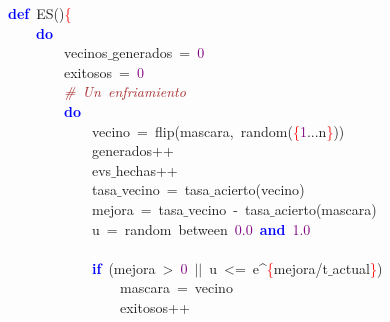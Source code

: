 \noindent
\mbox{}\textbf{\textcolor{Blue}{def}}\ ES\textcolor{BrickRed}{()}\textcolor{Red}{\{} \\
\mbox{}\ \ \ \ \textbf{\textcolor{Blue}{do}} \\
\mbox{}\ \ \ \ \ \ \ \ vecinos$\_$generados\ \textcolor{BrickRed}{=}\ \textcolor{Purple}{0} \\
\mbox{}\ \ \ \ \ \ \ \ exitosos\ \textcolor{BrickRed}{=}\ \textcolor{Purple}{0} \\
\mbox{}\ \ \ \ \ \ \ \ \textit{\textcolor{Brown}{\#\ Un\ enfriamiento}} \\
\mbox{}\ \ \ \ \ \ \ \ \textbf{\textcolor{Blue}{do}} \\
\mbox{}\ \ \ \ \ \ \ \ \ \ \ \ vecino\ \textcolor{BrickRed}{=}\ flip\textcolor{BrickRed}{(}mascara\textcolor{BrickRed}{,}\ random\textcolor{BrickRed}{(}\textcolor{Red}{\{}\textcolor{Purple}{1}\textcolor{BrickRed}{...}n\textcolor{Red}{\}}\textcolor{BrickRed}{))} \\
\mbox{}\ \ \ \ \ \ \ \ \ \ \ \ generados\textcolor{BrickRed}{++} \\
\mbox{}\ \ \ \ \ \ \ \ \ \ \ \ evs$\_$hechas\textcolor{BrickRed}{++} \\
\mbox{}\ \ \ \ \ \ \ \ \ \ \ \ tasa$\_$vecino\ \textcolor{BrickRed}{=}\ tasa$\_$acierto\textcolor{BrickRed}{(}vecino\textcolor{BrickRed}{)} \\
\mbox{}\ \ \ \ \ \ \ \ \ \ \ \ mejora\ \textcolor{BrickRed}{=}\ tasa$\_$vecino\ \textcolor{BrickRed}{-}\ tasa$\_$acierto\textcolor{BrickRed}{(}mascara\textcolor{BrickRed}{)} \\
\mbox{}\ \ \ \ \ \ \ \ \ \ \ \ u\ \textcolor{BrickRed}{=}\ random\ between\ \textcolor{Purple}{0.0}\ \textbf{\textcolor{Blue}{and}}\ \textcolor{Purple}{1.0} \\
\mbox{} \\
\mbox{}\ \ \ \ \ \ \ \ \ \ \ \ \textbf{\textcolor{Blue}{if}}\ \textcolor{BrickRed}{(}mejora\ \textcolor{BrickRed}{\textgreater{}}\ \textcolor{Purple}{0}\ \textcolor{BrickRed}{$|$$|$}\ u\ \textcolor{BrickRed}{\textless{}=}\ e\textcolor{BrickRed}{\textasciicircum{}}\textcolor{Red}{\{}mejora\textcolor{BrickRed}{/}t$\_$actual\textcolor{Red}{\}}\textcolor{BrickRed}{)} \\
\mbox{}\ \ \ \ \ \ \ \ \ \ \ \ \ \ \ \ mascara\ \textcolor{BrickRed}{=}\ vecino \\
\mbox{}\ \ \ \ \ \ \ \ \ \ \ \ \ \ \ \ exitosos\textcolor{BrickRed}{++} \\
